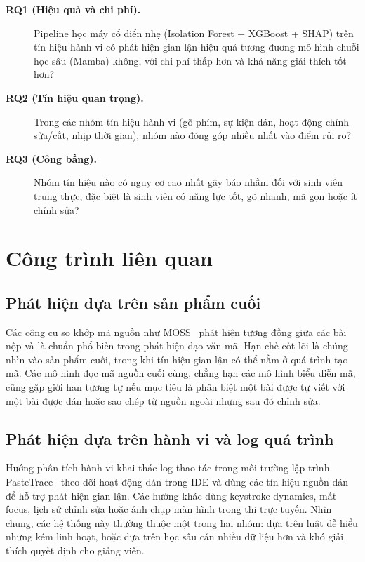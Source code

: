 \documentclass[runningheads]{llncs}
\begin{document}
\begin{description}
\item[\textbf{RQ1 (Hiệu quả và chi phí).}] Pipeline học máy cổ điển nhẹ
(Isolation Forest + XGBoost + SHAP) trên tín hiệu hành vi có phát hiện gian lận
hiệu quả tương đương mô hình chuỗi học sâu (Mamba) không, với chi phí thấp hơn
và khả năng giải thích tốt hơn?

\item[\textbf{RQ2 (Tín hiệu quan trọng).}] Trong các nhóm tín hiệu hành vi
(gõ phím, sự kiện dán, hoạt động chỉnh sửa/cắt, nhịp thời gian), nhóm nào đóng
góp nhiều nhất vào điểm rủi ro?

\item[\textbf{RQ3 (Công bằng).}] Nhóm tín hiệu nào có nguy cơ cao nhất gây báo
nhầm đối với sinh viên trung thực, đặc biệt là sinh viên có năng lực tốt, gõ
nhanh, mã gọn hoặc ít chỉnh sửa?
\end{description}

\section{Công trình liên quan}
\label{sec:related}

\subsection{Phát hiện dựa trên sản phẩm cuối}
Các công cụ so khớp mã nguồn như MOSS~\cite{moss} phát hiện tương đồng giữa
các bài nộp và là chuẩn phổ biến trong phát hiện đạo văn mã. Hạn chế cốt lõi là
chúng nhìn vào sản phẩm cuối, trong khi tín hiệu gian lận có thể nằm ở quá trình
tạo mã. Các mô hình đọc mã nguồn cuối cùng, chẳng hạn các mô hình biểu diễn mã,
cũng gặp giới hạn tương tự nếu mục tiêu là phân biệt một bài được tự viết với
một bài được dán hoặc sao chép từ nguồn ngoài nhưng sau đó chỉnh sửa.

\subsection{Phát hiện dựa trên hành vi và log quá trình}
Hướng phân tích hành vi khai thác log thao tác trong môi trường lập trình.
PasteTrace~\cite{pastetrace} theo dõi hoạt động dán trong IDE và dùng các tín
hiệu nguồn dán để hỗ trợ phát hiện gian lận. Các hướng khác dùng keystroke
dynamics, mất focus, lịch sử chỉnh sửa hoặc ảnh chụp màn hình trong thi trực
tuyến. Nhìn chung, các hệ thống này thường thuộc một trong hai nhóm: dựa trên
luật dễ hiểu nhưng kém linh hoạt, hoặc dựa trên học sâu cần nhiều dữ liệu hơn và
khó giải thích quyết định cho giảng viên.
\end{document}
